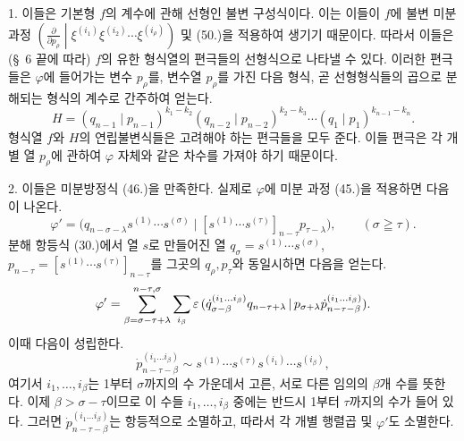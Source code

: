 1. 이들은 기본형 $f$의 계수에 관해 선형인 불변 구성식이다. 이는 이들이 $f$에 불변 미분 과정 $\left(\frac{\partial}{\partial p_\rho}\middle|\xi^{(i_1)}\xi^{(i_2)}\cdots\xi^{(i_\rho)}\right)$ 및 (50.)을 적용하여 생기기 때문이다. 따라서 이들은(\S\ 6 끝에 따라) $f$의 유한 형식열의 편극들의 선형식으로 나타낼 수 있다. 이러한 편극들은 $\varphi$에 들어가는 변수 $p_\rho$를, 변수열 $p_\rho$를 가진 다음 형식, 곧 선형형식들의 곱으로 분해되는 형식의 계수로 간주하여 얻는다.
\begin{equation}
 H=(q_{n-1}\mid p_{n-1})^{k_1-k_2}(q_{n-2}\mid p_{n-2})^{k_2-k_3}\cdots(q_1\mid p_1)^{k_{n-1}-k_n}.
\tag{52}
\end{equation}
형식열 $f$와 $H$의 연립불변식들은 고려해야 하는 편극들을 모두 준다. 이들 편극은 각 개별 열 $p_\rho$에 관하여 $\varphi$ 자체와 같은 차수를 가져야 하기 때문이다.

2. 이들은 미분방정식 (46.)을 만족한다. 실제로 $\varphi$에 미분 과정 (45.)을 적용하면 다음이 나온다.
\[
 \varphi'=\bigl(q_{n-\sigma-\lambda}s^{(1)}\cdots s^{(\sigma)}\mid [s^{(1)}\cdots s^{(\tau)}]_{n-\tau}p_{\tau-\lambda}\bigr),\qquad (\sigma\geqq\tau).
\]
분해 항등식 (30.)에서 열 $s$로 만들어진 열 $q_\sigma=s^{(1)}\cdots s^{(\sigma)}$, $p_{n-\tau}=[s^{(1)}\cdots s^{(\tau)}]_{n-\tau}$를 그곳의 $q_\rho,p_\tau$와 동일시하면 다음을 얻는다.
\[
 \varphi'=\sum_{\beta=\sigma-\tau+\lambda}^{n-\tau,\sigma}\sum_{i_\beta}\varepsilon\,
 (\dot{q}_{\sigma-\beta}^{(i_1\ldots i_\beta)}q_{n-\tau+\lambda}\,|\,p_{\sigma+\lambda}\dot{p}_{n-\tau-\beta}^{(i_1\ldots i_\beta)}).
\]
이때 다음이 성립한다.
\[
 \dot{p}_{n-\tau-\beta}^{(i_1\ldots i_\beta)}\sim s^{(1)}\cdots s^{(\tau)}s^{(i_1)}\cdots s^{(i_\beta)},
\]
여기서 $i_1,\ldots,i_\beta$는 1부터 $\sigma$까지의 수 가운데서 고른, 서로 다른 임의의 $\beta$개 수를 뜻한다. 이제 $\beta>\sigma-\tau$이므로 이 수들 $i_1,\ldots,i_\beta$ 중에는 반드시 1부터 $\tau$까지의 수가 들어 있다. 그러면 $\dot{p}_{n-\tau-\beta}^{(i_1\ldots i_\beta)}$는 항등적으로 소멸하고, 따라서 각 개별 행렬곱 및 $\varphi'$도 소멸한다.

